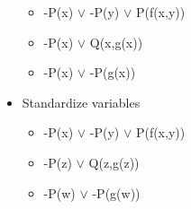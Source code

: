 \documentclass[compress, 9pt]{beamer}
\begin{document}
\begin{frame}
\begin{itemize}
\begin{itemize}
\item <15-> -P(x) $\vee$ -P(y) $\vee$ P(f(x,y))
\item <15-> -P(x) $\vee$ Q(x,g(x))
\item <15-> -P(x) $\vee$ -P(g(x))
\end{itemize}
\item <16-> Standardize variables
\begin{itemize}
\item <16-> -P(x) $\vee$ -P(y) $\vee$ P(f(x,y))
\item <16-> -P(z) $\vee$ Q(z,g(z))
\item <16-> -P(w) $\vee$ -P(g(w))
\end{itemize}
\end{itemize}
\end{frame}
\end{document}
